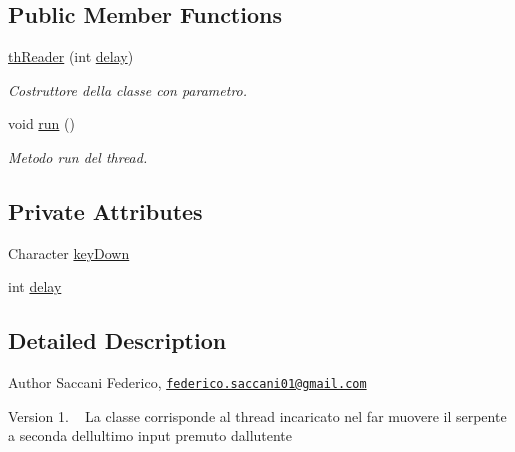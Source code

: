 \subsection*{Public Member Functions}
\begin{DoxyCompactItemize}
\item 
\mbox{\hyperlink{class_snake_1_1game_1_1threads_1_1th_reader_a9b984c882a0834ce79bbe3f2dac8b1c5}{th\+Reader}} (int \mbox{\hyperlink{class_snake_1_1game_1_1threads_1_1th_reader_a6f1be1f780ff54ec75b41451cd4d90bd}{delay}})
\begin{DoxyCompactList}\small\item\em Costruttore della classe con parametro. \end{DoxyCompactList}\item 
void \mbox{\hyperlink{class_snake_1_1game_1_1threads_1_1th_reader_a13a43e6d814de94978c515cb084873b1}{run}} ()
\begin{DoxyCompactList}\small\item\em Metodo run del thread. \end{DoxyCompactList}\end{DoxyCompactItemize}
\subsection*{Private Attributes}
\begin{DoxyCompactItemize}
\item 
Character \mbox{\hyperlink{class_snake_1_1game_1_1threads_1_1th_reader_a09bac1b4079089c0f6a6eff874a820b8}{key\+Down}}
\item 
int \mbox{\hyperlink{class_snake_1_1game_1_1threads_1_1th_reader_a6f1be1f780ff54ec75b41451cd4d90bd}{delay}}
\end{DoxyCompactItemize}


\subsection{Detailed Description}
\begin{DoxyAuthor}{Author}
Saccani Federico, \href{mailto:federico.saccani01@gmail.com}{\tt federico.\+saccani01@gmail.\+com} 
\end{DoxyAuthor}
\begin{DoxyVersion}{Version}
1. ~\newline
La classe corrisponde al thread incaricato nel far muovere il serpente a seconda dell\textquotesingle{}ultimo input premuto dall\textquotesingle{}utente 
\end{DoxyVersion}


